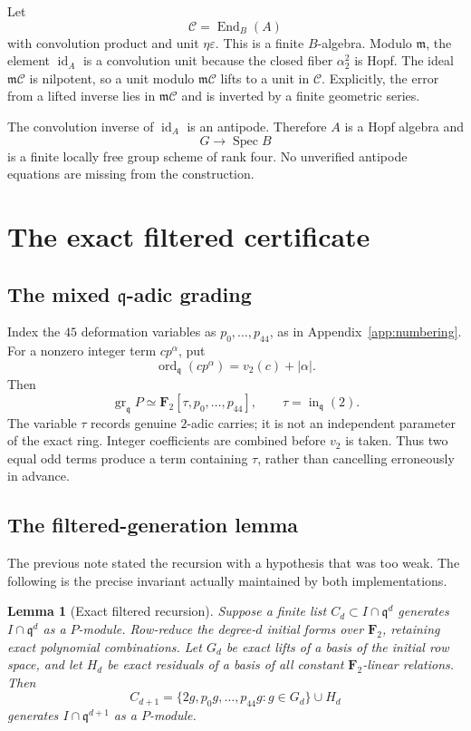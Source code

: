 \documentclass[11pt]{article}
\newtheorem{lemma}[theorem]{Lemma}
\theoremstyle{remark}
\newcommand{\F}{\mathbf F}
\newcommand{\Spec}{\operatorname{Spec}}
\newcommand{\gr}{\operatorname{gr}}
\newcommand{\ord}{\operatorname{ord}}
\newcommand{\id}{\operatorname{id}}
\newcommand{\q}{\mathfrak q}
\newcommand{\m}{\mathfrak m}
\newcommand{\eps}{\varepsilon}
\begin{document}
Let
\[
  \mathcal C=\operatorname{End}_B(A)
\]
with convolution product and unit \(\eta\eps\).  This is a finite \(B\)-algebra.
Modulo \(\m\), the element \(\id_A\) is a convolution unit because the closed
fiber \(\alpha_2^2\) is Hopf.  The ideal \(\m\mathcal C\) is nilpotent, so a
unit modulo \(\m\mathcal C\) lifts to a unit in \(\mathcal C\).  Explicitly,
the error from a lifted inverse lies in \(\m\mathcal C\) and is inverted by a
finite geometric series.

The convolution inverse of \(\id_A\) is an antipode.  Therefore \(A\) is a
Hopf algebra and
\[
  G\longrightarrow\Spec B
\]
is a finite locally free group scheme of rank four.  No unverified antipode
equations are missing from the construction.

\section{The exact filtered certificate}

\subsection{The mixed \texorpdfstring{\(\q\)}{q}-adic grading}

Index the \(45\) deformation variables as \(p_0,\ldots,p_{44}\), as in
Appendix~\ref{app:numbering}.  For a nonzero integer term \(c p^\alpha\), put
\[
  \ord_{\q}(c p^\alpha)=v_2(c)+|\alpha|.
\]
Then
\[
 \gr_{\q}P\simeq\F_2[\tau,p_0,\ldots,p_{44}],
 \qquad \tau=\operatorname{in}_{\q}(2).
\]
The variable \(\tau\) records genuine \(2\)-adic carries; it is not an
independent parameter of the exact ring.  Integer coefficients are combined
before \(v_2\) is taken.  Thus two equal odd terms produce a term containing
\(\tau\), rather than cancelling erroneously in advance.

\subsection{The filtered-generation lemma}

The previous note stated the recursion with a hypothesis that was too weak.
The following is the precise invariant actually maintained by both
implementations.

\begin{lemma}[Exact filtered recursion]\label{lem:filtered}
Suppose a finite list \(C_d\subset I\cap\q^d\) generates
\(I\cap\q^d\) as a \(P\)-module.  Row-reduce the degree-\(d\) initial forms
over \(\F_2\), retaining exact polynomial combinations.  Let \(G_d\) be exact
lifts of a basis of the initial row space, and let \(H_d\) be exact residuals
of a basis of all constant \(\F_2\)-linear relations.  Then
\[
 C_{d+1}=
 \{2g,p_0g,\ldots,p_{44}g:g\in G_d\}\cup H_d
\]
generates \(I\cap\q^{d+1}\) as a \(P\)-module.
\end{lemma}
\end{document}
